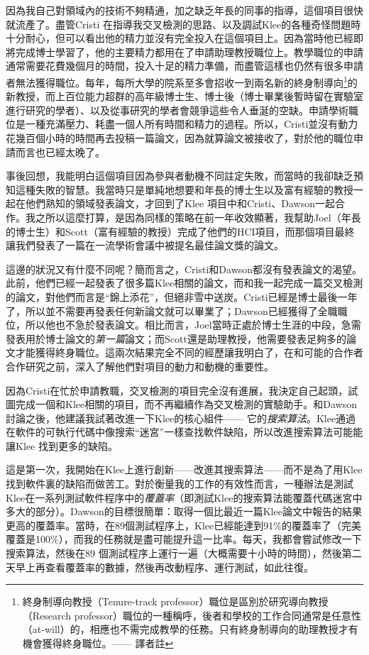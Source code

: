 \documentclass[12pt,UTF8,nofonts]{book}
\begin{document}
因為我自己對領域內的技術不夠精通，加之缺乏年長的同事的指導，這個項目很快就流產了。盡管Cristi 在指導我交叉檢測的思路、以及調試Klee的各種奇怪問題時十分耐心，但可以看出他的精力並沒有完全投入在這個項目上。因為當時他已經即將完成博士學習了，他的主要精力都用在了申請助理教授職位上。教學職位的申請通常需要花費幾個月的時間，投入十足的精力準備，而盡管這樣也仍然有很多申請者無法獲得職位。每年，每所大學的院系至多會招收一到兩名新的終身制導向\footnote{終身制導向教授（Tenure-track professor）職位是區別於研究導向教授（Research professor）職位的一種稱呼，後者和學校的工作合同通常是任意性（at-will）的，相應也不需完成教學的任務。只有終身制導向的助理教授才有機會獲得終身職位。—— 譯者註}的新教授，而上百位能力超群的高年級博士生、博士後（博士畢業後暫時留在實驗室進行研究的學者）、以及從事研究的學者會競爭這些令人垂涎的空缺。申請學術職位是一種充滿壓力、耗盡一個人所有時間和精力的過程。所以，Cristi並沒有動力花幾百個小時的時間再去投稿一篇論文，因為就算論文被接收了，對於他的職位申請而言也已經太晚了。

事後回想，我能明白這個項目因為參與者動機不同註定失敗，而當時的我卻缺乏預知這種失敗的智慧。我當時只是單純地想要和年長的博士生以及富有經驗的教授一起在他們熟知的領域發表論文，才回到了Klee 項目中和Cristi、Dawson一起合作。我之所以這麼打算，是因為同樣的策略在前一年收效顯著，我幫助Joel（年長的博士生）和Scott（富有經驗的教授）完成了他們的HCI項目，而那個項目最終讓我們發表了一篇在一流學術會議中被提名最佳論文獎的論文。

這邊的狀況又有什麼不同呢？簡而言之，Cristi和Dawson都沒有發表論文的渴望。此前，他們已經一起發表了很多篇Klee相關的論文，而和我一起完成一篇交叉檢測的論文，對他們而言是“錦上添花”，但絕非雪中送炭。Cristi已經是博士最後一年了，所以並不需要再發表任何新論文就可以畢業了；Dawson已經獲得了全職職位，所以他也不急於發表論文。相比而言，Joel當時正處於博士生涯的中段，急需發表用於博士論文的\emph{第一篇}論文；而Scott還是助理教授，他需要發表足夠多的論文才能獲得終身職位。這兩次結果完全不同的經歷讓我明白了，在和可能的合作者合作研究之前，深入了解他們對項目的動力和動機的重要性。

\breakline

因為Cristi在忙於申請教職，交叉檢測的項目完全沒有進展，我決定自己起頭，試圖完成一個和Klee相關的項目，而不再繼續作為交叉檢測的實驗助手。和Dawson討論之後，他建議我試著改進一下Klee的核心組件—— 它的\emph{搜索算法}。Klee通過在軟件的可執行代碼中像搜索“迷宮”一樣查找軟件缺陷，所以改進搜索算法可能能讓Klee 找到更多的缺陷。

這是第一次，我開始在Klee上進行創新——改進其搜索算法——而不是為了用Klee找到軟件裏的缺陷而做苦工。對於衡量我的工作的有效性而言，一種辦法是測試Klee在一系列測試軟件程序中的\emph{覆蓋率}（即測試Klee的搜索算法能覆蓋代碼迷宮中多大的部分）。Dawson的目標很簡單：取得一個比最近一篇Klee論文中報告的結果更高的覆蓋率。當時，在89個測試程序上，Klee已經能達到91\%的覆蓋率了（完美覆蓋是100\%），而我的任務就是盡可能提升這一比率。每天，我都會嘗試修改一下搜索算法，然後在89 個測試程序上運行一遍（大概需要十小時的時間），然後第二天早上再查看覆蓋率的數據，然後再改動程序、運行測試，如此往復。
\end{document}
